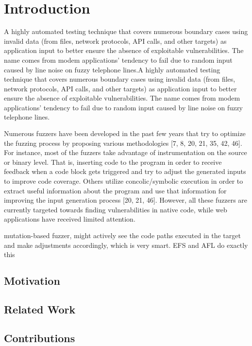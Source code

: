 \chapter{Introduction}
\minitoc
\vspace*{1cm}

A highly automated testing technique that covers numerous boundary cases
using invalid data (from files, network protocols, API calls, and other targets)
as application input to better ensure the absence of exploitable vulnerabilities.
The name comes from modem applications’ tendency to fail due
to random input caused by line noise on fuzzy telephone lines.A highly automated testing technique that covers numerous boundary cases
using invalid data (from files, network protocols, API calls, and other targets)
as application input to better ensure the absence of exploitable vulnerabilities.
The name comes from modem applications’ tendency to fail due
to random input caused by line noise on fuzzy telephone lines.


Numerous fuzzers have been developed in the past few
years that try to optimize the fuzzing process by proposing
various methodologies [7, 8, 20, 21, 35, 42, 46]. For instance,
most of the fuzzers take advantage of instrumentation on
the source or binary level. That is, inserting code to the
program in order to receive feedback when a code block gets
triggered and try to adjust the generated inputs to improve
code coverage. Others utilize concolic/symbolic execution
in order to extract useful information about the program
and use that information for improving the input generation
process [20, 21, 46]. However, all these fuzzers are currently
targeted towards finding vulnerabilities in native code, while
web applications have received limited attention.


mutation-based fuzzer, might actively see the code paths executed in the target and make adjustments accordingly, which is very smart. EFS and AFL do exactly this


\section{Motivation}

\section{Related Work}

\section{Contributions}
